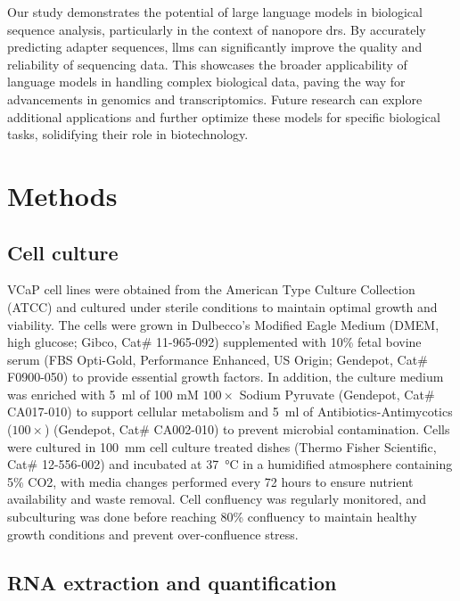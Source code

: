 \documentclass[pdflatex, sn-mathphys-num, lineno]{sn-jnl}%
\theoremstyle{thmstyleone}%
\theoremstyle{thmstyletwo}%
\theoremstyle{thmstylethree}%
\begin{document}
Our study demonstrates the potential of large language models in biological sequence analysis, particularly in the context of nanopore \gls{drs}.
By accurately predicting adapter sequences,  \glspl{llm} can significantly improve the quality and reliability of sequencing data.
This showcases the broader applicability of language models in handling complex biological data, paving the way for advancements in genomics and transcriptomics.
Future research can explore additional applications and further optimize these models for specific biological tasks, solidifying their role in biotechnology.



\section{Methods}\label{sec:methods}

\subsection{Cell culture}

VCaP cell lines were obtained from the American Type Culture Collection (ATCC) and cultured under sterile conditions to maintain optimal growth and viability.
The cells were grown in Dulbecco's Modified Eagle Medium (DMEM, high glucose; Gibco, Cat\# 11-965-092) supplemented with 10\% fetal bovine serum (FBS Opti-Gold, Performance Enhanced, US Origin; Gendepot, Cat\# F0900-050) to provide essential growth factors.
In addition, the culture medium was enriched with \SI{5}{\ml} of 100 mM \( 100\times \) Sodium Pyruvate (Gendepot, Cat\# CA017-010) to support cellular metabolism and \SI{5}{\ml} of Antibiotics-Antimycotics (\( 100\times \)) (Gendepot, Cat\# CA002-010) to prevent microbial contamination.
Cells were cultured in \SI{100}{\mm} cell culture treated dishes (Thermo Fisher Scientific, Cat\# 12-556-002) and incubated at \SI{37}{\degreeCelsius} in a humidified atmosphere containing 5\% CO2, with media changes performed every 72 hours to ensure nutrient availability and waste removal.
Cell confluency was regularly monitored, and subculturing was done before reaching 80\% confluency to maintain healthy growth conditions and prevent over-confluence stress.

\subsection{RNA extraction and quantification}
\end{document}
